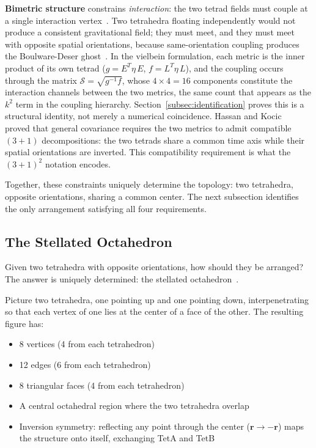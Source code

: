 \documentclass[aps,prd,preprint,superscriptaddress,showpacs,preprintnumbers,amsmath,amssymb,nofootinbib]{revtex4-2}
\begin{document}
\textbf{Bimetric structure} constrains \emph{interaction}: the two tetrad fields must couple at a single interaction vertex~\cite{hinterbichler2012}. Two tetrahedra floating independently would not produce a consistent gravitational field; they must meet, and they must meet with opposite spatial orientations, because same-orientation coupling produces the Boulware-Deser ghost~\cite{boulware1972}. In the vielbein formulation, each metric is the inner product of its own tetrad ($g = E^T\eta\,E$, $f = L^T\eta\,L$), and the coupling occurs through the matrix $\mathcal{S} = \sqrt{g^{-1}f}$, whose $4 \times 4 = 16$ components constitute the interaction channels between the two metrics, the same count that appears as the $k^2$ term in the coupling hierarchy. Section~\ref{subsec:identification} proves this is a structural identity, not merely a numerical coincidence. Hassan and Kocic~\cite{hassankocic2018} proved that general covariance requires the two metrics to admit compatible $(3{+}1)$ decompositions: the two tetrads share a common time axis while their spatial orientations are inverted. This compatibility requirement is what the $(3{+}1)^2$ notation encodes.

Together, these constraints uniquely determine the topology: two tetrahedra, opposite orientations, sharing a common center. The next subsection identifies the only arrangement satisfying all four requirements.

\subsection{The Stellated Octahedron}
\label{subsec:stellated}

Given two tetrahedra with opposite orientations, how should they be arranged? The answer is uniquely determined: the stellated octahedron~\cite{coxeter1973}.

Picture two tetrahedra, one pointing up and one pointing down, interpenetrating so that each vertex of one lies at the center of a face of the other. The resulting figure has:
\begin{itemize}
\item 8 vertices (4 from each tetrahedron)
\item 12 edges (6 from each tetrahedron)
\item 8 triangular faces (4 from each tetrahedron)
\item A central octahedral region where the two tetrahedra overlap
\item Inversion symmetry: reflecting any point through the center ($\mathbf{r} \to -\mathbf{r}$) maps the structure onto itself, exchanging TetA and TetB
\end{itemize}
\end{document}
